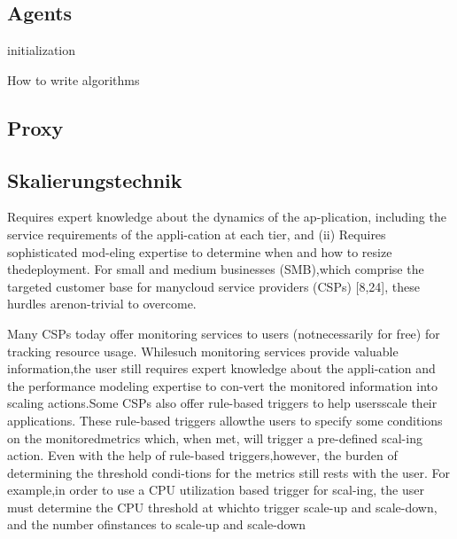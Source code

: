 \documentclass[runningheads]{llncs}
\begin{document}
\subsection{Agents}

\begin{algorithm}[H]
	\SetAlgoLined
	initialization\;
	\caption{How to write algorithms}
\end{algorithm}
	
\subsection{Proxy}

\subsection{Skalierungstechnik} \label{skalierungstechnik}

Requires expert knowledge about the dynamics of the ap-plication, including the service requirements of the appli-cation at each tier, and (ii) Requires sophisticated mod-eling expertise to determine when and how to resize thedeployment. For small and medium businesses (SMB),which comprise the targeted customer base for manycloud service providers (CSPs) [8,24], these hurdles arenon-trivial to overcome.

Many CSPs today offer monitoring services to users (notnecessarily for free) for tracking resource usage. Whilesuch monitoring services provide valuable information,the user still requires expert knowledge about the appli-cation and the performance modeling expertise to con-vert the monitored information into scaling actions.Some CSPs also offer rule-based triggers to help usersscale their applications. These rule-based triggers allowthe users to specify some conditions on the monitoredmetrics which, when met, will trigger a pre-defined scal-ing action.  Even with the help of rule-based triggers,however, the burden of determining the threshold condi-tions for the metrics still rests with the user. For example,in order to use a CPU utilization based trigger for scal-ing, the user must determine the CPU threshold at whichto trigger scale-up and scale-down, and the number ofinstances to scale-up and scale-down

\end{document}
